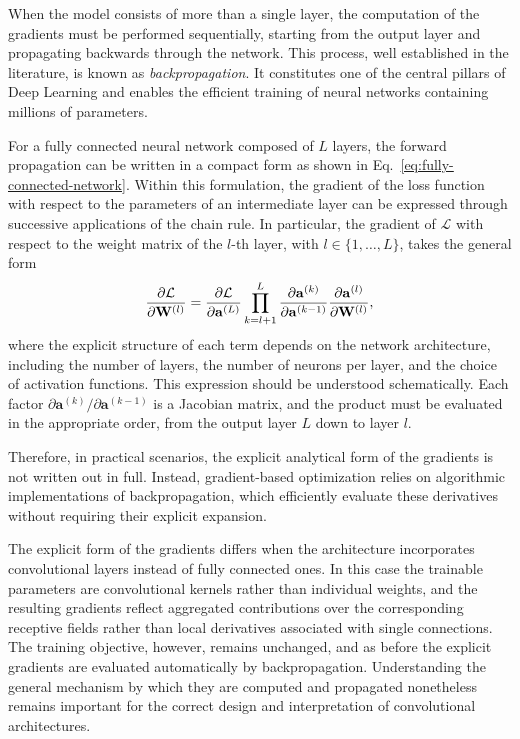 When the model consists of more than a single layer, the computation of the gradients must be performed sequentially, starting from the output layer and propagating backwards through the network. This process, well established in the literature, is known as \emph{backpropagation}. It constitutes one of the central pillars of Deep Learning and enables the efficient training of neural networks containing millions of parameters.

For a fully connected neural network composed of $L$ layers, the forward propagation can be written in a compact form as shown in Eq.~\eqref{eq:fully-connected-network}. Within this formulation, the gradient of the loss function with respect to the parameters of an intermediate layer can be expressed through successive applications of the chain rule. In particular, the gradient of $\mathcal{L}$ with respect to the weight matrix of the $l$-th layer, with $l \in \{1,\dots,L\}$, takes the general form
\begin{equation}
    \pdv{\mathcal{L}}{\mathbf{W}^{(l)}}
    =
    \pdv{\mathcal{L}}{\mathbf{a}^{(L)}}
    \prod_{k=l+1}^{L}
    \pdv{\mathbf{a}^{(k)}}{\mathbf{a}^{(k-1)}}
    \pdv{\mathbf{a}^{(l)}}{\mathbf{W}^{(l)}} ,
\end{equation}
where the explicit structure of each term depends on the network architecture, including the number of layers, the number of neurons per layer, and the choice of activation functions. This expression should be understood schematically. Each factor $\partial \mathbf{a}^{(k)}/\partial \mathbf{a}^{(k-1)}$ is a Jacobian matrix, and the product must be evaluated in the appropriate order, from the output layer $L$ down to layer $l$.

Therefore, in practical scenarios, the explicit analytical form of the gradients is not written out in full. Instead, gradient-based optimization relies on algorithmic implementations of backpropagation, which efficiently evaluate these derivatives without requiring their explicit expansion.

The explicit form of the gradients differs when the architecture incorporates convolutional layers instead of fully connected ones. In this case the trainable parameters are convolutional kernels rather than individual weights, and the resulting gradients reflect aggregated contributions over the corresponding receptive fields rather than local derivatives associated with single connections. The training objective, however, remains unchanged, and as before the explicit gradients are evaluated automatically by backpropagation. Understanding the general mechanism by which they are computed and propagated nonetheless remains important for the correct design and interpretation of convolutional architectures.

